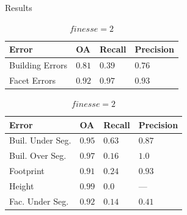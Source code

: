 \documentclass{beamer}
\begin{document}
            \begin{frame}{Results}
                \begin{table}
                    \begin{subtable}{.4\textwidth}
                        \tiny
                        \begin{center}
                            \begin{tabular}{x{1cm} x{.5cm} x{.5cm} x{.5cm}}
                                \toprule
                                {\bf Error} & {\bf OA} & {\bf Recall} & {\bf Precision} \\
                                \midrule
                                Building Errors & $0.81$ & $0.39$ & $0.76$ \\
                                \midrule
                                Facet Errors & $0.92$ & $0.97$ & $0.93$ \\
                                \bottomrule
                            \end{tabular}
                            \caption{\tiny\label{tab::finesse2} $finesse = 2$}
                        \end{center}
                    \end{subtable}
                    \begin{subtable}{.45\textwidth}
                        \tiny
                        \begin{center}
                            \begin{tabular}{x{1.75cm} x{.5cm} x{.5cm} x{.5cm}}
                                \toprule
                                {\bf Error} & {\bf OA} & {\bf Recall} & {\bf Precision} \\
                                \midrule
                                Buil. Under Seg. & $0.95$ & $0.63$ & $0.87$ \\
                                \midrule
                                Buil. Over Seg. & $0.97$ & $0.16$ & $1.0$ \\
                                \midrule
                                Footprint & $0.91$ & $0.24$ & $0.93$ \\
                                \midrule
                                Height & $0.99$ & $0.0$ & --- \\
                                \midrule
                                \midrule
                                Fac. Under Seg. & $0.92$ & $0.14$ & $0.41$ \\

\end{tabular}
\end{center}
\end{subtable}
\end{table}
\end{frame}
\end{document}
